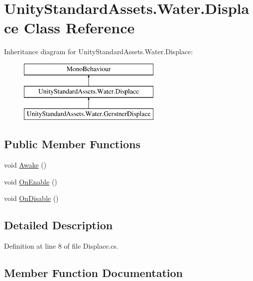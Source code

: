 \hypertarget{class_unity_standard_assets_1_1_water_1_1_displace}{}\section{Unity\+Standard\+Assets.\+Water.\+Displace Class Reference}
\label{class_unity_standard_assets_1_1_water_1_1_displace}
Inheritance diagram for Unity\+Standard\+Assets.\+Water.\+Displace\+:\begin{figure}[H]
\begin{center}
\leavevmode
\includegraphics[height=3.000000cm]{class_unity_standard_assets_1_1_water_1_1_displace}
\end{center}
\end{figure}
\subsection*{Public Member Functions}
\begin{DoxyCompactItemize}
\item 
void \mbox{\hyperlink{class_unity_standard_assets_1_1_water_1_1_displace_acf1e38d869a1c847ba7600e4ca57602d}{Awake}} ()
\item 
void \mbox{\hyperlink{class_unity_standard_assets_1_1_water_1_1_displace_aae897c2c43a2a0a34872e70d67f9ead2}{On\+Enable}} ()
\item 
void \mbox{\hyperlink{class_unity_standard_assets_1_1_water_1_1_displace_a943603120ed56993ad8e75fa20d38b44}{On\+Disable}} ()
\end{DoxyCompactItemize}


\subsection{Detailed Description}


Definition at line 8 of file Displace.\+cs.



\subsection{Member Function Documentation}
\mbox{\label{class_unity_standard_assets_1_1_water_1_1_displace_acf1e38d869a1c847ba7600e4ca57602d}} 
